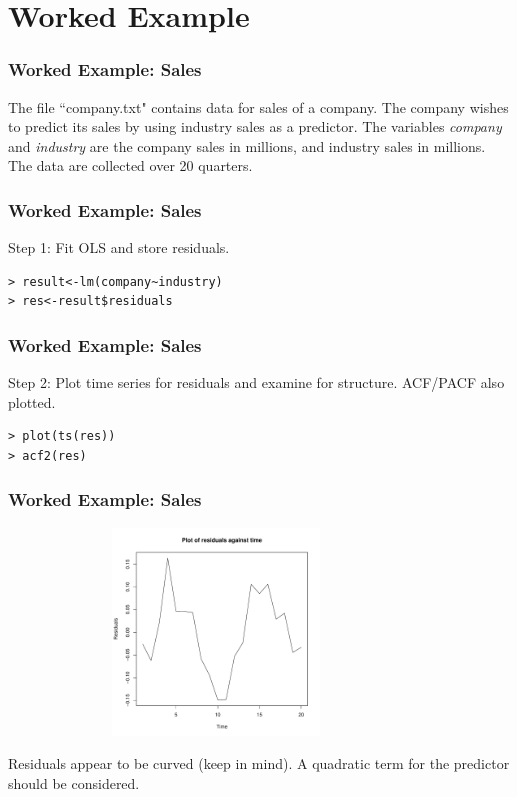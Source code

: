 \documentclass[%
xcolor=pdftex]{beamer}
\begin{document}
\section{Worked Example}
\frame{\tableofcontents[currentsection]}

\begin{frame}
\frametitle{Worked Example: Sales}

The file ``company.txt" contains data for sales of a company. The company wishes to predict its sales by using industry sales as a predictor. The variables \textit{company} and \textit{industry} are the company sales in millions, and industry sales in millions. The data are collected over 20 quarters.

\end{frame}

\begin{frame}[fragile]
\frametitle{Worked Example: Sales}

Step 1: Fit OLS and store residuals.

\begin{verbatim}
> result<-lm(company~industry)
> res<-result$residuals
\end{verbatim}

\end{frame}

\begin{frame}[fragile]
\frametitle{Worked Example: Sales}


Step 2: Plot time series for residuals and examine for structure. ACF/PACF also plotted.

\begin{verbatim}
> plot(ts(res))
> acf2(res)
\end{verbatim}

\end{frame}

\begin{frame}
\frametitle{Worked Example: Sales}

\includegraphics[width=110mm, height=55mm]{ts.pdf}

Residuals appear to be curved (keep in mind). A quadratic term for the predictor should be considered.

\end{frame}
\end{document}
